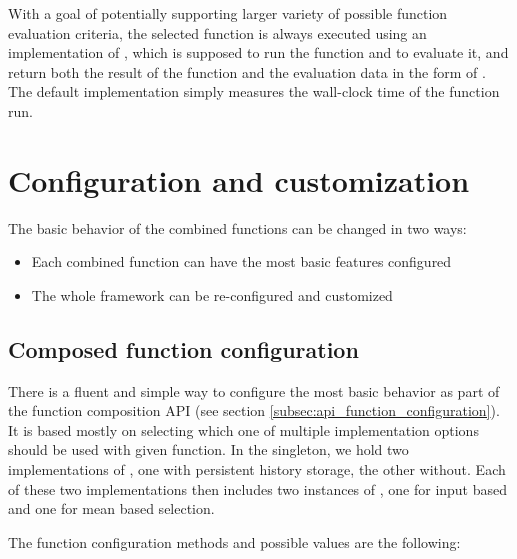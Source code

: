 With a goal of potentially supporting larger variety of possible function evaluation criteria, the selected function is always executed using an implementation of , which is supposed to run the function and to evaluate it, and return both the result of the function and the evaluation data in the form of . The default implementation simply measures the wall-clock time of the function run.

\section{Configuration and customization}

The basic behavior of the combined functions can be changed in two ways:
\begin{itemize}
	\item Each combined function can have the most basic features configured
	\item The whole framework can be re-configured and customized
\end{itemize}

\subsection{Composed function configuration}

There is a fluent and simple way to configure the most basic behavior as part of the function composition API (see section \ref{subsec:api_function_configuration}). It is based mostly on selecting which one of multiple implementation options should be used with given function. In the  singleton, we hold two implementations of , one with persistent history storage, the other without. Each of these two implementations then includes two instances of  , one for input based and one for mean based selection.

The function configuration methods and possible values are the following:

